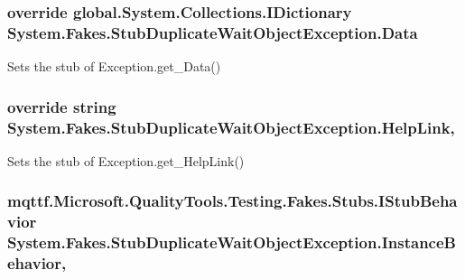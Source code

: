 \hypertarget{class_system_1_1_fakes_1_1_stub_duplicate_wait_object_exception_a4d0d54838db9912611f99bec3991554e}{
\subsubsection[{Data}]{\setlength{\rightskip}{0pt plus 5cm}override global.\-System.\-Collections.\-I\-Dictionary System.\-Fakes.\-Stub\-Duplicate\-Wait\-Object\-Exception.\-Data\hspace{0.3cm}{\ttfamily [get]}}}\label{class_system_1_1_fakes_1_1_stub_duplicate_wait_object_exception_a4d0d54838db9912611f99bec3991554e}


Sets the stub of Exception.\-get\-\_\-\-Data()

\hypertarget{class_system_1_1_fakes_1_1_stub_duplicate_wait_object_exception_a4c56a39d575aca2704e163035d7330d8}{
\subsubsection[{Help\-Link}]{\setlength{\rightskip}{0pt plus 5cm}override string System.\-Fakes.\-Stub\-Duplicate\-Wait\-Object\-Exception.\-Help\-Link\hspace{0.3cm}{\ttfamily [get]}, {\ttfamily [set]}}}\label{class_system_1_1_fakes_1_1_stub_duplicate_wait_object_exception_a4c56a39d575aca2704e163035d7330d8}


Sets the stub of Exception.\-get\-\_\-\-Help\-Link()

\hypertarget{class_system_1_1_fakes_1_1_stub_duplicate_wait_object_exception_a5411681a7d3e3ae3929772f4353bd36e}{
\subsubsection[{Instance\-Behavior}]{\setlength{\rightskip}{0pt plus 5cm}mqttf.\-Microsoft.\-Quality\-Tools.\-Testing.\-Fakes.\-Stubs.\-I\-Stub\-Behavior System.\-Fakes.\-Stub\-Duplicate\-Wait\-Object\-Exception.\-Instance\-Behavior\hspace{0.3cm}{\ttfamily [get]}, {\ttfamily [set]}}}\label{class_system_1_1_fakes_1_1_stub_duplicate_wait_object_exception_a5411681a7d3e3ae3929772f4353bd36e}



